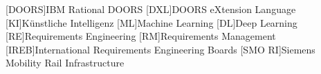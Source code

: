 
\begin{acronym}
	[DOORS]{IBM Rational DOORS}
	[DXL]{DOORS eXtension Language}
	[KI]{Künstliche Intelligenz}
	[ML]{Machine Learning}
	[DL]{Deep Learning}
	[RE]{Requirements Engineering}
	[RM]{Requirements Management}
	[IREB]{International Requirements Engineering Boards}
	[SMO RI]{Siemens Mobility Rail Infrastructure}
\end{acronym}


